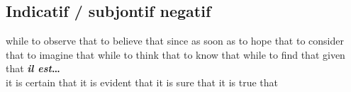 \subsection*{Indicatif / subjontif negatif}
   {while}
   {to observe that}
   {to believe that}
   {since}
   {as soon as}
   {to hope that}
   {to consider that}
   {to imagine that}
   {while}
   {to think that}
   {to know that}
   {while}
   {to find that}
   {given that}
     {\bf {\em il est}\ldots}\\
        {it is certain that}
        {it is evident that}
        {it is sure that}
        {it is true that}



